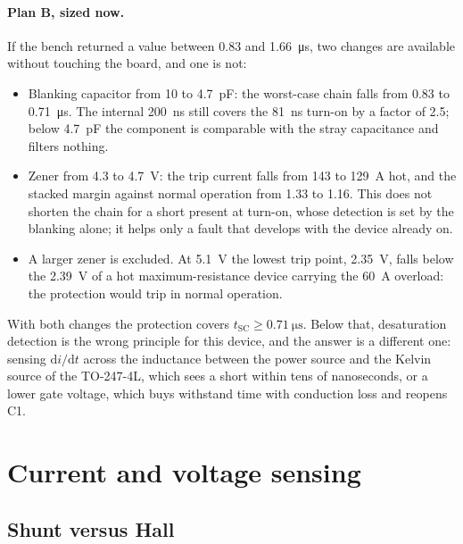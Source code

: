 \paragraph{Plan B, sized now.}
\label{sec:planb}
If the bench returned a value between \SI{0.83}{} and
\SI{1.66}{\micro\second}, two changes are available without touching the
board, and one is not:
%
\begin{itemize}
  \item Blanking capacitor from \SI{10}{} to \SI{4.7}{\pico\farad}:
        the worst-case chain falls from \SI{0.83}{} to
        \SI{0.71}{\micro\second}. The internal \SI{200}{\nano\second}
        still covers the \SI{81}{\nano\second} turn-on by a factor of 2.5;
        below \SI{4.7}{\pico\farad} the component is comparable with the
        stray capacitance and filters nothing.
  \item Zener from \SI{4.3}{} to \SI{4.7}{\volt}: the trip current
        falls from \SI{143}{} to \SI{129}{\ampere} hot, and the stacked
        margin against normal operation from 1.33 to 1.16. This does not
        shorten the chain for a short present at turn-on, whose detection
        is set by the blanking alone; it helps only a fault that develops
        with the device already on.
  \item A larger zener is excluded. At \SI{5.1}{\volt} the lowest trip
        point, \SI{2.35}{\volt}, falls below the \SI{2.39}{\volt} of a
        hot maximum-resistance device carrying the \SI{60}{\ampere}
        overload: the protection would trip in normal operation.
\end{itemize}
%
With both changes the protection covers $t_\mathrm{SC} \geq
\SI{0.71}{\micro\second}$. Below that, desaturation detection is the wrong
principle for this device, and the answer is a different one: sensing
$\mathrm{d}i/\mathrm{d}t$ across the inductance between the power source
and the Kelvin source of the TO-247-4L, which sees a short within tens of
nanoseconds, or a lower gate voltage, which buys withstand time with
conduction loss and reopens C1.

\section{Current and voltage sensing}

\subsection{Shunt versus Hall}

